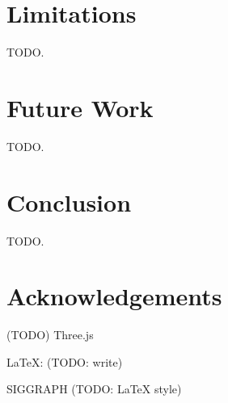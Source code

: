 \documentclass[conference]{acmsiggraph}
\begin{document}
\section{Limitations}

TODO.


\section{Future Work}

TODO.


\section{Conclusion}

TODO.


\section*{Acknowledgements}

(TODO) Three.js

\LaTeX : (TODO: write)

SIGGRAPH (TODO: LaTeX style)




\end{document}
